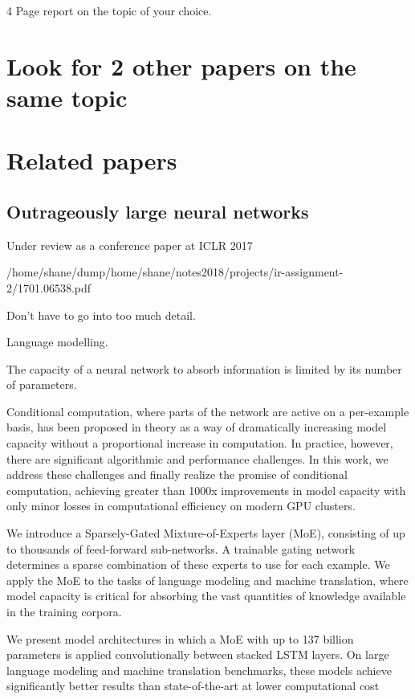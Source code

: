 \documentclass[11pt]{article}
\author{shane}
\date{\today}
\title{}
\begin{document}
\tableofcontents

4 Page report on the topic of your choice. 

\section{Look for 2 other papers on the same topic}
\label{sec:org7109831}



\section{Related papers}
\label{sec:org1f82685}
\subsection{Outrageously large neural networks}
\label{sec:org391b83e}

Under review as a conference paper at ICLR 2017


/home/shane/dump/home/shane/notes2018/projects/ir-assignment-2/1701.06538.pdf

Don't have to go into too much detail.

Language modelling.

The capacity of a neural network to absorb information is limited by its number of
parameters.

Conditional computation, where parts of the network are active on a
per-example basis, has been proposed in theory as a way of dramatically increasing
model capacity without a proportional increase in computation. In practice,
however, there are significant algorithmic and performance challenges. In this
work, we address these challenges and finally realize the promise of conditional
computation, achieving greater than 1000x improvements in model capacity with
only minor losses in computational efficiency on modern GPU clusters.

We introduce
a Sparsely-Gated Mixture-of-Experts layer (MoE), consisting of up to
thousands of feed-forward sub-networks. A trainable gating network determines
a sparse combination of these experts to use for each example. We apply the MoE
to the tasks of language modeling and machine translation, where model capacity
is critical for absorbing the vast quantities of knowledge available in the training
corpora.

We present model architectures in which a MoE with up to 137 billion
parameters is applied convolutionally between stacked LSTM layers. On large
language modeling and machine translation benchmarks, these models achieve
significantly better results than state-of-the-art at lower computational cost
\end{document}
